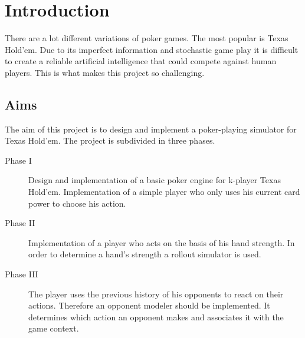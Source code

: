 \chapter{Introduction}
There are a lot different variations of poker games. The most popular is Texas Hold'em. Due to its imperfect information and stochastic game play it is difficult to create a reliable artificial intelligence that could compete against human players. This is what makes this project so challenging.

\section{Aims}
The aim of this project is to design and implement a poker-playing simulator for Texas Hold'em. The project is subdivided in three phases.
\begin{description}
	\item[Phase I] Design and implementation of a basic poker engine for k-player Texas Hold'em. Implementation of a simple player who only uses his current card power to choose his action. 
	\item[Phase II] Implementation of a player who acts on the basis of his hand strength. In order to determine a hand's strength a rollout simulator is used.
	\item[Phase III] The player uses the previous history of his opponents to react on their actions. Therefore an opponent modeler should be implemented.  It determines which action an opponent makes and associates it with the game context.
\end{description}

